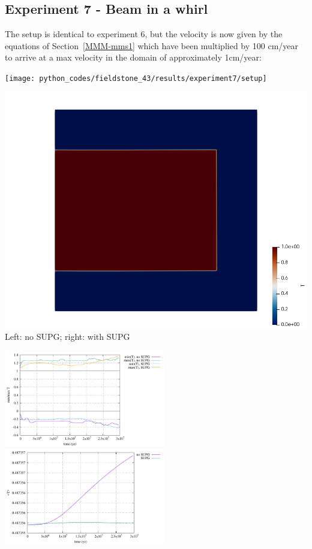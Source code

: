 \subsection*{Experiment 7 - Beam in a whirl}

The setup is identical to experiment 6, but the velocity is now given by 
the equations of Section~\ref{MMM-mms1} which have been multiplied by 100 cm/year 
to arrive at a max velocity in the domain of approximately 1cm/year:

\begin{center}
\texttt{[image: python\_codes/fieldstone\_43/results/experiment7/setup]}
\end{center}

\begin{center}
\includegraphics[width=14cm]{python_codes/fieldstone_43/results/experiment7/T}\\
{\captionfont Left: no SUPG; right: with SUPG}
\end{center}

\begin{center}
\includegraphics[width=7cm]{python_codes/fieldstone_43/results/experiment7/stats_T}
\includegraphics[width=7cm]{python_codes/fieldstone_43/results/experiment7/avrg_T}
\end{center}

